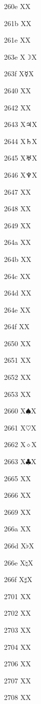 \documentclass[11pt]{article}
\begin{document}
260e X{}X

261b X{}X

261e X{}X

263e X{\ensuremath{\rightmoon}}X

263f X{\ensuremath{\mercury}}X

2640 X{\venus}X

2642 X{\male}X

2643 X{\ensuremath{\jupiter}}X

2644 X{\ensuremath{\saturn}}X

2645 X{\ensuremath{\uranus}}X

2646 X{\ensuremath{\neptune}}X

2647 X{\pluto}X

2648 X{\aries}X

2649 X{\taurus}X

264a X{\gemini}X

264b X{\cancer}X

264c X{\leo}X

264d X{\virgo}X

264e X{\libra}X

264f X{\scorpio}X

2650 X{\sagittarius}X

2651 X{\capricornus}X

2652 X{\aquarius}X

2653 X{\pisces}X

2660 X{\ensuremath{\spadesuit}}X

2661 X{\ensuremath{\heartsuit}}X

2662 X{\ensuremath{\diamond}}X

2663 X{\ensuremath{\clubsuit}}X

2665 X{}X

2666 X{}X

2669 X{\quarternote}X

266a X{\eighthnote}X

266d X{\ensuremath{\flat}}X

266e X{\ensuremath{\natural}}X

266f X{\ensuremath{\sharp}}X

2701 X{}X

2702 X{}X

2703 X{}X

2704 X{}X

2706 X{}X

2707 X{}X

2708 X{}X
\end{document}
